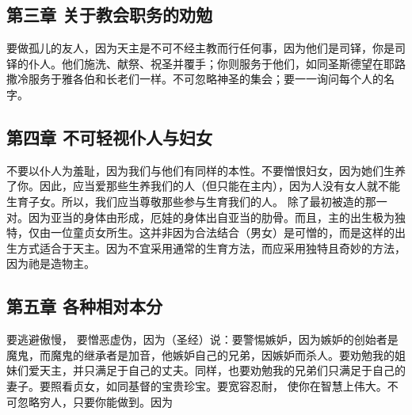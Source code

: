 
\subsection{第三章 关于教会职务的劝勉}

 要做孤儿的友人，因为天主是不可不经主教而行任何事，因为他们是司铎，你是司铎的仆人。他们施洗、献祭、祝圣并覆手；你则服务于他们，如同圣斯德望在耶路撒冷服务于雅各伯和长老们一样。不可忽略神圣的集会；要一一询问每个人的名字。\par


\subsection{第四章 不可轻视仆人与妇女}

不要以仆人为羞耻，因为我们与他们有同样的本性。不要憎恨妇女，因为她们生养了你。因此，应当爱那些生养我们的人（但只能在主内），因为人没有女人就不能生育子女。所以，我们应当尊敬那些参与生育我们的人。 除了最初被造的那一对。因为亚当的身体由形成，厄娃的身体出自亚当的肋骨。而且，主的出生极为独特，仅由一位童贞女所生。这并非因为合法结合（男女）是可憎的，而是这样的出生方式适合于天主。因为不宜采用通常的生育方法，而应采用独特且奇妙的方法，因为祂是造物主。\par


\subsection{第五章 各种相对本分}

要逃避傲慢， 要憎恶虚伪，因为（圣经）说：要警惕嫉妒，因为嫉妒的创始者是魔鬼，而魔鬼的继承者是加音，他嫉妒自己的兄弟，因嫉妒而杀人。要劝勉我的姐妹们爱天主，并只满足于自己的丈夫。同样，也要劝勉我的兄弟们只满足于自己的妻子。要照看贞女，如同基督的宝贵珍宝。要宽容忍耐， 使你在智慧上伟大。不可忽略穷人，只要你能做到。因为\par

